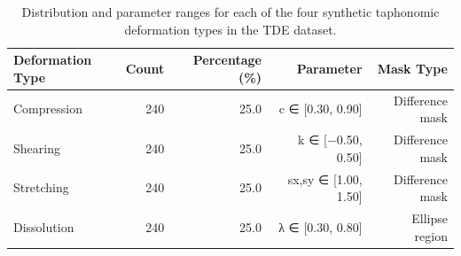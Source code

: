 \begin{table}[htbp]
\caption{Distribution and parameter ranges for each of the four synthetic taphonomic deformation types in the TDE dataset.}
\label{tab:deformation_distribution}
\begin{tabular}{lrrrr}
\toprule
Deformation Type & Count & Percentage (\%) & Parameter & Mask Type \\
\midrule
Compression & 240 & 25.0 & c ∈ [0.30, 0.90] & Difference mask \\
Shearing & 240 & 25.0 & k ∈ [−0.50, 0.50] & Difference mask \\
Stretching & 240 & 25.0 & sx,sy ∈ [1.00, 1.50] & Difference mask \\
Dissolution & 240 & 25.0 & λ ∈ [0.30, 0.80] & Ellipse region \\
\bottomrule
\end{tabular}
\end{table}
